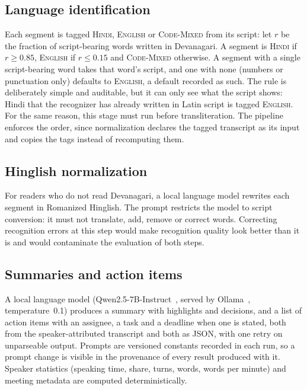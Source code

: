 \subsection{Language identification}
Each segment is tagged \textsc{Hindi}, \textsc{English} or \textsc{Code-Mixed}
from its script: let $r$ be the fraction of script-bearing words written in
Devanagari. A segment is \textsc{Hindi} if $r \geq 0.85$, \textsc{English} if
$r \leq 0.15$ and \textsc{Code-Mixed} otherwise. A segment with a single
script-bearing word takes that word's script, and one with none (numbers or
punctuation only) defaults to \textsc{English}, a default recorded as such. The rule is deliberately
simple and auditable, but it can only see what the script shows: Hindi that the
recognizer has already written in Latin script is tagged \textsc{English}. For
the same reason, this stage must run before transliteration. The pipeline
enforces the order, since normalization declares the tagged transcript as its
input and copies the tags instead of recomputing them.

\subsection{Hinglish normalization}
For readers who do not read Devanagari, a local language model rewrites each
segment in Romanized Hinglish. The prompt restricts the model to script
conversion: it must not translate, add, remove or correct words. Correcting
recognition errors at this step would make recognition quality look better than
it is and would contaminate the evaluation of both steps.

\subsection{Summaries and action items}
A local language model (Qwen2.5-7B-Instruct~\cite{qwen2024qwen25}, served by
Ollama~\cite{ollama}, temperature~0.1) produces a summary with highlights and
decisions, and a list of action items with an assignee, a task and a deadline
when one is stated, both from the speaker-attributed transcript and both as
JSON, with one retry on unparseable output. Prompts are versioned constants
recorded in each run, so a prompt change is visible in the provenance of every
result produced with it. Speaker statistics (speaking time, share, turns,
words, words per minute) and meeting metadata are computed deterministically.

